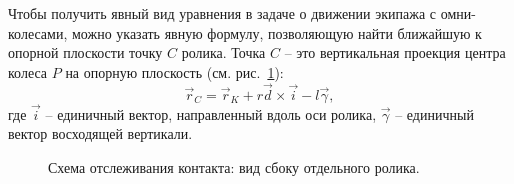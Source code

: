 


Чтобы получить явный вид уравнения в задаче о движении экипажа с омни-колесами, можно указать явную формулу, позволяющую найти ближайшую к опорной плоскости точку $C$ ролика. Точка $C$ -- это вертикальная проекция центра колеса $P$ на опорную плоскость (см. рис.~\ref{ContactScheme}):
\begin{equation}
    \vec{r}_C = \vec{r}_K + r\vec{d} \times \vec{i} - l\vec{\gamma},
    \label{3_2_0}
\end{equation}
где $\vec{i}$ -- единичный вектор, направленный вдоль оси ролика, $\vec{\gamma}$ -- единичный вектор восходящей вертикали.

\begin{figure}[htb]
    \centering
    \caption{Схема отслеживания контакта: вид сбоку отдельного ролика.}
    \label{ContactScheme}
\end{figure}



